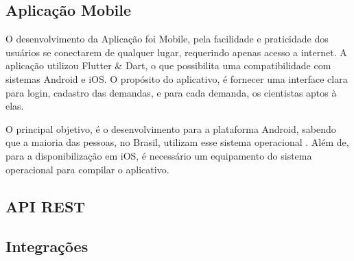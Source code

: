 
\subsection{Aplicação Mobile}\label{subsec:app}
O desenvolvimento da Aplicação foi Mobile, pela facilidade e praticidade dos usuários se conectarem de qualquer lugar, requerindo apenas acesso a 
internet. A aplicação utilizou Flutter {\&} Dart, o que possibilita uma compatibilidade com sistemas Android e iOS. O propósito do aplicativo, é 
fornecer uma interface clara para login, cadastro das demandas, e para cada demanda, os cientistas aptos à elas.

O principal objetivo, é o desenvolvimento para a plataforma Android, sabendo que a maioria das pessoas, no Brasil, utilizam esse sistema 
operacional \cite{StatCounter}. Além de, para a disponibilização em iOS, é necessário um equipamento do sistema operacional para compilar o aplicativo.

\subsection{API REST}\label{subsec:apirest}

\subsection{Integrações}\label{subsec:integrar}
